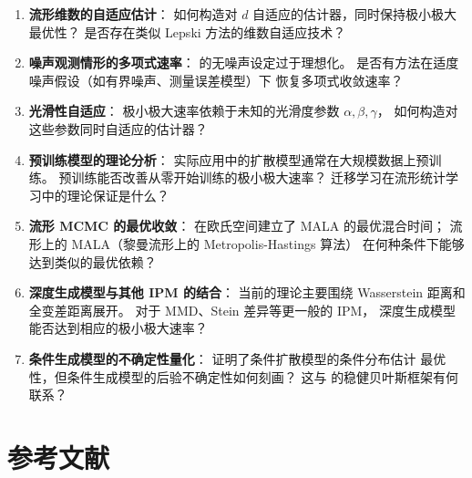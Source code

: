 \begin{enumerate}
    \item \textbf{流形维数的自适应估计}：
          如何构造对 $d$ 自适应的估计器，同时保持极小极大最优性？
          是否存在类似 Lepski 方法的维数自适应技术？

    \item \textbf{噪声观测情形的多项式速率}：
          \citep{tang2022minimax} 的无噪声设定过于理想化。
          是否有方法在适度噪声假设（如有界噪声、测量误差模型）下
          恢复多项式收敛速率？

    \item \textbf{光滑性自适应}：
          极小极大速率依赖于未知的光滑度参数 $\alpha,\beta,\gamma$，
          如何构造对这些参数同时自适应的估计器？

    \item \textbf{预训练模型的理论分析}：
          实际应用中的扩散模型通常在大规模数据上预训练。
          预训练能否改善从零开始训练的极小极大速率？
          迁移学习在流形统计学习中的理论保证是什么？

    \item \textbf{流形 MCMC 的最优收敛}：
          \citep{tang2024mala} 在欧氏空间建立了 MALA 的最优混合时间；
          流形上的 MALA（黎曼流形上的 Metropolis-Hastings 算法）
          在何种条件下能够达到类似的最优依赖？

    \item \textbf{深度生成模型与其他 IPM 的结合}：
          当前的理论主要围绕 Wasserstein 距离和全变差距离展开。
          对于 MMD、Stein 差异等更一般的 IPM，
          深度生成模型能否达到相应的极小极大速率？

    \item \textbf{条件生成模型的不确定性量化}：
          \citep{tang2025conditional} 证明了条件扩散模型的条件分布估计
          最优性，但条件生成模型的后验不确定性如何刻画？
          这与 \citep{tang2023robust} 的稳健贝叶斯框架有何联系？
\end{enumerate}

\section{参考文献}\label{sec:refs}

